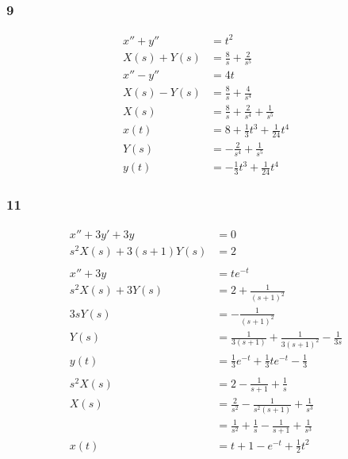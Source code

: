 \documentclass{article}
\begin{document}
\subsubsection{9}

\begin{align*}
  x'' + y''   & = t^2                                         \\
  X(s) + Y(s) & = \frac{8}{s} + \frac{2}{s^5}                 \\
  x'' - y''   & = 4 t                                         \\
  X(s) - Y(s) & = \frac{8}{s} + \frac{4}{s^4}                 \\
  X(s)        & = \frac{8}{s} + \frac{2}{s^4} + \frac{1}{s^5} \\
  x(t)        & = 8 + \frac{1}{3} t^3 + \frac{1}{24} t^4      \\
  Y(s)        & = -\frac{2}{s^4} + \frac{1}{s^5}              \\
  y(t)        & = -\frac{1}{3} t^3 + \frac{1}{24} t^4
\end{align*}

\subsubsection{11}

\begin{align*}
  x'' + 3 y' + 3 y          & = 0                                                             \\
  s^2 X(s) + 3 (s + 1) Y(s) & = 2                                                             \\ \\
  x'' + 3 y                 & = t e^{-t}                                                      \\
  s^2 X(s) + 3 Y(s)         & = 2 + \frac{1}{(s + 1)^2}                                       \\
  3 s Y(s)                  & = -\frac{1}{(s + 1)^2}                                          \\
  Y(s)                      & = \frac{1}{3 (s + 1)} + \frac{1}{3 (s + 1)^2} - \frac{1}{3 s}   \\
  y(t)                      & = \frac{1}{3} e^{-t} + \frac{1}{3} t e^{-t} - \frac{1}{3}       \\ \\
  s^2 X(s)                  & = 2 - \frac{1}{s + 1} + \frac{1}{s}                             \\
  X(s)                      & = \frac{2}{s^2} - \frac{1}{s^2 (s + 1)} + \frac{1}{s^3}         \\
                            & = \frac{1}{s^2} + \frac{1}{s} - \frac{1}{s + 1} + \frac{1}{s^3} \\
  x(t)                      & = t + 1 - e^{-t} + \frac{1}{2} t^2
\end{align*}
\end{document}
